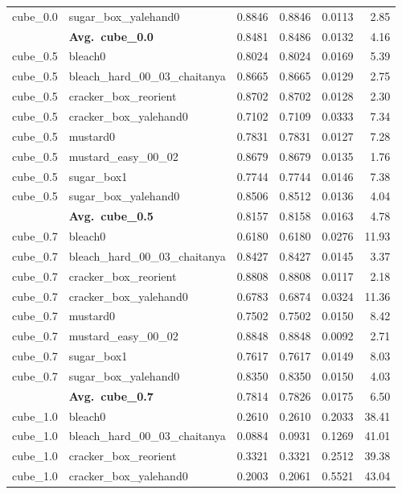 \begin{longtable}{llrrrr}
  cube_0.0 & sugar\_box\_yalehand0 & 0.8846 & 0.8846 & 0.0113 & 2.85 \\
  \cmidrule{2-6}
  & \textbf{Avg.~cube_0.0} & 0.8481 & 0.8486 & 0.0132 & 4.16 \\
  \midrule
  cube_0.5 & bleach0 & 0.8024 & 0.8024 & 0.0169 & 5.39 \\
  cube_0.5 & bleach\_hard\_00\_03\_chaitanya & 0.8665 & 0.8665 & 0.0129 & 2.75 \\
  cube_0.5 & cracker\_box\_reorient & 0.8702 & 0.8702 & 0.0128 & 2.30 \\
  cube_0.5 & cracker\_box\_yalehand0 & 0.7102 & 0.7109 & 0.0333 & 7.34 \\
  cube_0.5 & mustard0 & 0.7831 & 0.7831 & 0.0127 & 7.28 \\
  cube_0.5 & mustard\_easy\_00\_02 & 0.8679 & 0.8679 & 0.0135 & 1.76 \\
  cube_0.5 & sugar\_box1 & 0.7744 & 0.7744 & 0.0146 & 7.38 \\
  cube_0.5 & sugar\_box\_yalehand0 & 0.8506 & 0.8512 & 0.0136 & 4.04 \\
  \cmidrule{2-6}
  & \textbf{Avg.~cube_0.5} & 0.8157 & 0.8158 & 0.0163 & 4.78 \\
  \midrule
  cube_0.7 & bleach0 & 0.6180 & 0.6180 & 0.0276 & 11.93 \\
  cube_0.7 & bleach\_hard\_00\_03\_chaitanya & 0.8427 & 0.8427 & 0.0145 & 3.37 \\
  cube_0.7 & cracker\_box\_reorient & 0.8808 & 0.8808 & 0.0117 & 2.18 \\
  cube_0.7 & cracker\_box\_yalehand0 & 0.6783 & 0.6874 & 0.0324 & 11.36 \\
  cube_0.7 & mustard0 & 0.7502 & 0.7502 & 0.0150 & 8.42 \\
  cube_0.7 & mustard\_easy\_00\_02 & 0.8848 & 0.8848 & 0.0092 & 2.71 \\
  cube_0.7 & sugar\_box1 & 0.7617 & 0.7617 & 0.0149 & 8.03 \\
  cube_0.7 & sugar\_box\_yalehand0 & 0.8350 & 0.8350 & 0.0150 & 4.03 \\
  \cmidrule{2-6}
  & \textbf{Avg.~cube_0.7} & 0.7814 & 0.7826 & 0.0175 & 6.50 \\
  \midrule
  cube_1.0 & bleach0 & 0.2610 & 0.2610 & 0.2033 & 38.41 \\
  cube_1.0 & bleach\_hard\_00\_03\_chaitanya & 0.0884 & 0.0931 & 0.1269 & 41.01 \\
  cube_1.0 & cracker\_box\_reorient & 0.3321 & 0.3321 & 0.2512 & 39.38 \\
  cube_1.0 & cracker\_box\_yalehand0 & 0.2003 & 0.2061 & 0.5521 & 43.04 \\

\end{longtable}
